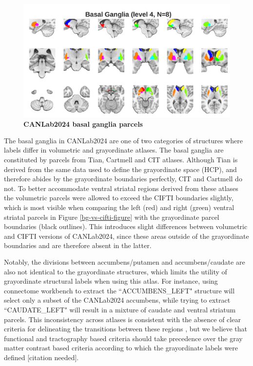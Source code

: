\documentclass[10pt,letterpaper]{article}
\begin{document}
\begin{figure}[t]
\begin{minipage}{\linewidth}
\end{minipage}
\begin{minipage}{\linewidth}
\includegraphics[width=\linewidth]{images/bg_coarsest.png}
\end{minipage}
\caption{
{\bf
CANLab2024 basal ganglia parcels} 
}
\label{bg-granularities-figure}
\end{figure}

The basal ganglia in CANLab2024 are one of two categories of structures where labels differ in volumetric and grayordinate atlases. The basal ganglia are constituted by parcels from Tian, Cartmell and CIT atlases. Although Tian is derived from the same data used to define the grayordinate space (HCP), and therefore abides by the grayordinate boundaries perfectly, CIT and Cartmell do not. To better accommodate ventral striatal regions derived from these atlases the volumetric parcels were allowed to exceed the CIFTI boundaries slightly, which is most visible when comparing the left (red) and right (green) ventral striatal parcels in Figure \ref{bg-vs-cifti-figure} with the grayordinate parcel boundaries (black outlines). This introduces slight differences between volumetric and CIFTI versions of CANLab2024, since these areas outside of the grayordinate boundaries and are therefore absent in the latter. 

Notably, the divisions between accumbens/putamen and accumbens/caudate are also not identical to the grayordinate structures, which limits the utility of grayordinate structural labels when using this atlas. For instance, using connectome workbench to extract the ``ACCUMBENS\_LEFT" structure will select only a subset of the CANLab2024 accumbens, while trying to extract ``CAUDATE\_LEFT" will result in a mixture of caudate and ventral striatum parcels. This inconsistency across atlases is consistent with the absence of clear criteria for delineating the transitions between these regions , but we believe that functional  and tractography based criteria  should take precedence over the gray matter contrast based criteria according to which the grayordinate labels were defined [citation needed].
\end{document}
